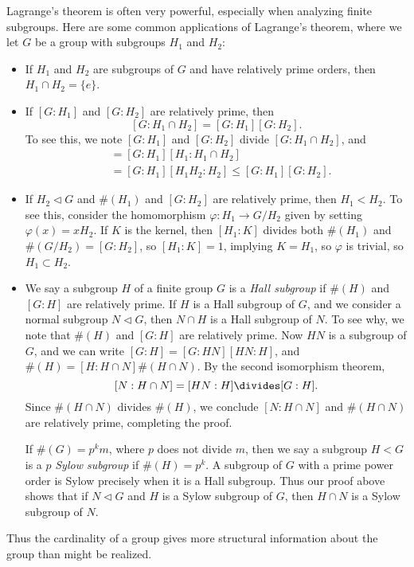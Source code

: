Lagrange's theorem is often very powerful, especially when analyzing finite subgroups. Here are some common applications of Lagrange's theorem, where we let $G$ be a group with subgroups $H_1$ and $H_2$:
%
\begin{itemize}
    \item If $H_1$ and $H_2$ are subgroups of $G$ and have relatively prime orders, then $H_1 \cap H_2 = \{ e \}$.

    \item If $[G:H_1]$ and $[G:H_2]$ are relatively prime, then
    \[ [G:H_1 \cap H_2] = [G:H_1][G:H_2]. \]
    To see this, we note $[G:H_1]$ and $[G:H_2]$ divide $[G:H_1 \cap H_2]$, and
    \begin{align*}
        [G:H_1 \cap H_2] &= [G:H_1][H_1: H_1 \cap H_2]\\
        &= [G:H_1][H_1H_2: H_2] \leq [G:H_1][G:H_2].
    \end{align*}

    \item If $H_2 \lhd G$ and $\#(H_1)$ and $[G:H_2]$ are relatively prime, then $H_1 < H_2$. To see this, consider the homomorphism $\varphi: H_1 \to G/H_2$ given by setting $\varphi(x) = xH_2$. If $K$ is the kernel, then $[H_1:K]$ divides both $\#(H_1)$ and $\#(G/H_2) = [G:H_2]$, so $[H_1:K] = 1$, implying $K = H_1$, so $\varphi$ is trivial, so $H_1 \subset H_2$.

    \item We say a subgroup $H$ of a finite group $G$ is a \emph{Hall subgroup} if $\#(H)$ and $[G:H]$ are relatively prime. If $H$ is a Hall subgroup of $G$, and we consider a normal subgroup $N \lhd G$, then $N \cap H$ is a Hall subgroup of $N$. To see why, we note that $\#(H)$ and $[G:H]$ are relatively prime. Now $HN$ is a subgroup of $G$, and we can write $[G:H] = [G:HN][HN:H]$, and $\#(H) = [H:H \cap N] \#(H \cap N)$. By the second isomorphism theorem,
    \[ [N:H \cap N] = [HN:H] \divides [G:H]. \]
    Since $\#(H \cap N)$ divides $\#(H)$, we conclude $[N:H \cap N]$ and $\#(H \cap N)$ are relatively prime, completing the proof.

    If $\#(G) = p^k m$, where $p$ does not divide $m$, then we say a subgroup $H < G$ is a $p$ \emph{Sylow subgroup} if $\#(H) = p^k$. A subgroup of $G$ with a prime power order is Sylow precisely when it is a Hall subgroup. Thus our proof above shows that if $N \lhd G$ and $H$ is a Sylow subgroup of $G$, then $H \cap N$ is a Sylow subgroup of $N$.
\end{itemize}
%
Thus the cardinality of a group gives more structural information about the group than might be realized.

